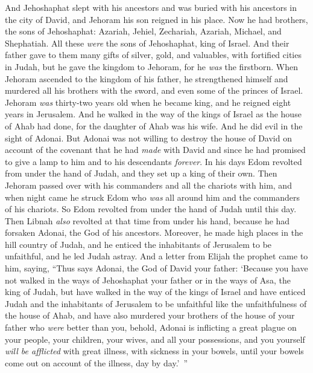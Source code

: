 \begin{biblechapter} %
 And Jehoshaphat slept with his ancestors and was buried with his ancestors in the city of David, and Jehoram his son reigned in his place.
\verse Now he had brothers, the sons of Jehoshaphat: Azariah, Jehiel, Zechariah, Azariah, Michael, and Shephatiah. All these \textit{were} the sons of Jehoshaphat, king of Israel.
\verse And their father gave to them many gifts of silver, gold, and valuables, with fortified cities in Judah, but he gave the kingdom to Jehoram, for he \textit{was} the firstborn.
\verse When Jehoram ascended to the kingdom of his father, he strengthened himself and murdered all his brothers with the sword, and even some of the princes of Israel.
\verse Jehoram \textit{was} thirty-two years old when he became king, and he reigned eight years in Jerusalem.
\verse And he walked in the way of the kings of Israel as the house of Ahab had done, for the daughter of Ahab was his wife. And he did evil in the sight of Adonai.
\verse But Adonai was not willing to destroy the house of David on account of the covenant that he had \textit{made} with David and since he had promised to give a lamp to him and to his descendants \textit{forever}.
\verse In his days Edom revolted from under the hand of Judah, and they set up a king of their own.
\verse Then Jehoram passed over with his commanders and all the chariots with him, and when night came he struck Edom who \textit{was} all around him and the commanders of his chariots.
\verse So Edom revolted from under the hand of Judah until this day. Then Libnah \textit{also} revolted at that time from under his hand, because he had forsaken Adonai, the God of his ancestors.
\verse Moreover, he made high places in the hill country of Judah, and he enticed the inhabitants of Jerusalem to be unfaithful, and he led Judah astray.
\verse And a letter from Elijah the prophet came to him, saying, “Thus says Adonai, the God of David your father: ‘Because you have not walked in the ways of Jehoshaphat your father or in the ways of Asa, the king of Judah,
\verse but have walked in the way of the kings of Israel and have enticed Judah and the inhabitants of Jerusalem to be unfaithful like the unfaithfulness of the house of Ahab, and have also murdered your brothers of the house of your father who \textit{were} better than you,
\verse behold, Adonai is inflicting a great plague on your people, your children, your wives, and all your possessions,
\verse and you yourself \textit{will be afflicted} with great illness, with sickness in your bowels, until your bowels come out on account of the illness, day by day.’ ”

\end{biblechapter}
